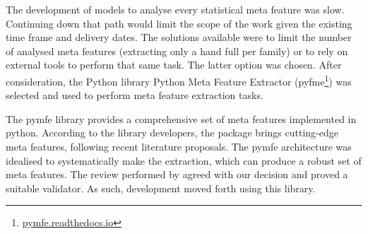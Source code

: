 The development of models to analyse every statistical meta feature was slow. Continuing down that path would limit the scope of the work given the existing time frame and delivery dates. The solutions available were to limit the number of analysed meta features (extracting only a hand full per family) or to rely on external tools to perform that same task. The latter option was chosen. After consideration, the Python library Python Meta Feature Extractor (pyfme\footnote{\href{https://pymfe.readthedocs.io/en/latest/index.html}{pymfe.readthedocs.io}}) was selected and used to perform meta feature extraction tasks.

The pymfe library provides a comprehensive set of meta features implemented in python. According to the library developers, the package brings cutting-edge meta features, following recent literature proposals. The pymfe architecture was idealised to systematically make the extraction, which can produce a robust set of meta features. The review performed by \cite{alcobacca2020mfe} agreed with our decision and proved a suitable validator. As such, development moved forth using this library.

